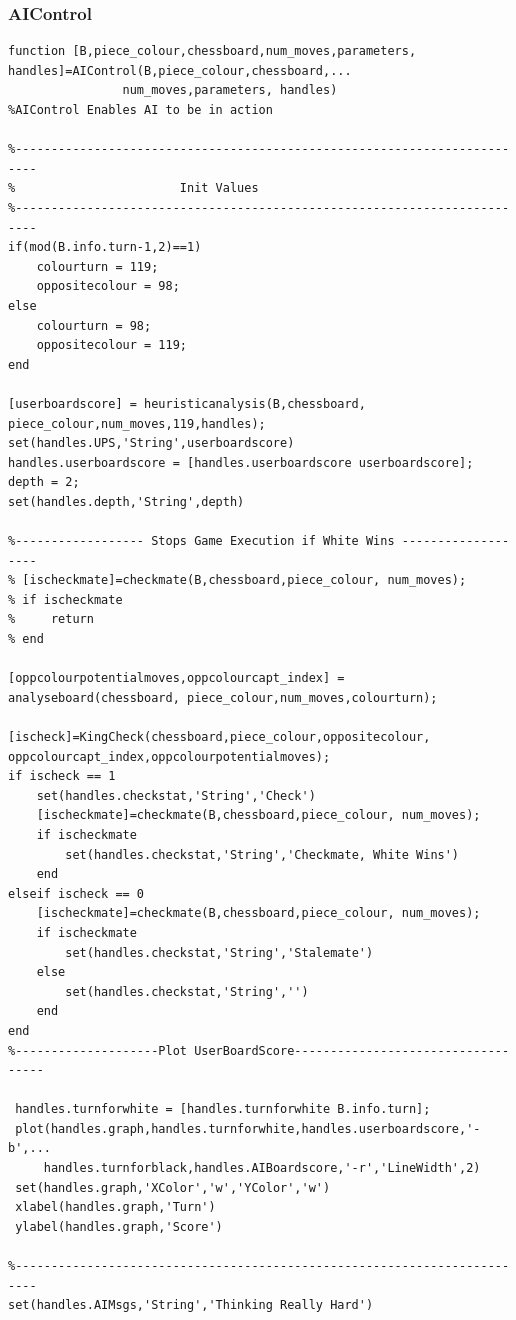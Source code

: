 \documentclass[11pt,a4paper]{article}
\begin{document}
\subsubsection{AIControl}
\begin{lstlisting}
function [B,piece_colour,chessboard,num_moves,parameters, handles]=AIControl(B,piece_colour,chessboard,...
                num_moves,parameters, handles)
%AIControl Enables AI to be in action

%-------------------------------------------------------------------------
%                       Init Values
%-------------------------------------------------------------------------
if(mod(B.info.turn-1,2)==1)
    colourturn = 119;
    oppositecolour = 98;
else
    colourturn = 98;
    oppositecolour = 119;
end

[userboardscore] = heuristicanalysis(B,chessboard, piece_colour,num_moves,119,handles);
set(handles.UPS,'String',userboardscore)
handles.userboardscore = [handles.userboardscore userboardscore];
depth = 2;
set(handles.depth,'String',depth)

%------------------ Stops Game Execution if White Wins -------------------
% [ischeckmate]=checkmate(B,chessboard,piece_colour, num_moves);
% if ischeckmate
%     return
% end

[oppcolourpotentialmoves,oppcolourcapt_index] = analyseboard(chessboard, piece_colour,num_moves,colourturn);

[ischeck]=KingCheck(chessboard,piece_colour,oppositecolour, oppcolourcapt_index,oppcolourpotentialmoves);
if ischeck == 1
    set(handles.checkstat,'String','Check')
    [ischeckmate]=checkmate(B,chessboard,piece_colour, num_moves);
    if ischeckmate
        set(handles.checkstat,'String','Checkmate, White Wins')
    end
elseif ischeck == 0
    [ischeckmate]=checkmate(B,chessboard,piece_colour, num_moves);
    if ischeckmate
        set(handles.checkstat,'String','Stalemate')
    else
        set(handles.checkstat,'String','')
    end
end
%--------------------Plot UserBoardScore-----------------------------------

 handles.turnforwhite = [handles.turnforwhite B.info.turn];
 plot(handles.graph,handles.turnforwhite,handles.userboardscore,'-b',...
     handles.turnforblack,handles.AIBoardscore,'-r','LineWidth',2)
 set(handles.graph,'XColor','w','YColor','w')
 xlabel(handles.graph,'Turn')
 ylabel(handles.graph,'Score')

%-------------------------------------------------------------------------
set(handles.AIMsgs,'String','Thinking Really Hard')


\end{lstlisting}
\end{document}
